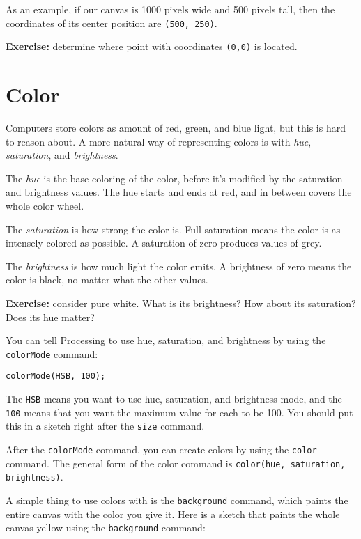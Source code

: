 \documentclass[
]{leaflet}
\begin{document}
As an example, if our canvas is 1000 pixels wide and 500 pixels tall, then the coordinates of its center position are \texttt{(500, 250)}.

\textbf{Exercise:} determine where point with coordinates \texttt{(0,0)} is located.

\section{Color}

Computers store colors as amount of red, green, and blue light, but this is hard to reason about.
A more natural way of representing colors is with \textit{hue}, \textit{saturation}, and \textit{brightness}.

The \textit{hue} is the base coloring of the color, before it's modified by the saturation and brightness values.
The hue starts and ends at red, and in between covers the whole color wheel.

The \textit{saturation} is how strong the color is.
Full saturation means the color is as intensely colored as possible.
A saturation of zero produces values of grey.

The \textit{brightness} is how much light the color emits.
A brightness of zero means the color is black, no matter what the other values.

\textbf{Exercise:} consider pure white. What is its brightness? How about its saturation? Does its hue matter?

You can tell Processing to use hue, saturation, and brightness by using the \texttt{colorMode} command:

\begin{lstlisting}
colorMode(HSB, 100);
\end{lstlisting}

The \texttt{HSB} means you want to use hue, saturation, and brightness mode, and the \texttt{100} means that you want the maximum value for each to be 100.
You should put this in a sketch right after the \texttt{size} command.

After the \texttt{colorMode} command, you can create colors by using the \texttt{color} command.
The general form of the color command is \texttt{color(hue, saturation, brightness)}.

A simple thing to use colors with is the \texttt{background} command, which paints the entire canvas with the color you give it.
Here is a sketch that paints the whole canvas yellow using the \texttt{background} command:
\end{document}
